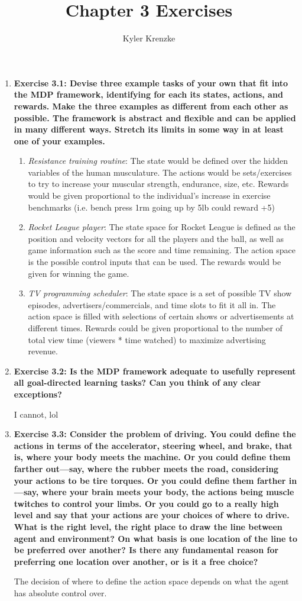 \documentclass[11pt]{article}
\title{Chapter 3 Exercises}
\author{Kyler Krenzke}
\date{}
\begin{document}
	\maketitle
	
	\begin{enumerate}
	
		\item \textbf{Exercise 3.1: Devise three example tasks of your own that fit into the MDP framework, identifying for each its states, actions, and rewards. Make the three
		examples as different from each other as possible. The framework is abstract and flexible and can be applied in many different ways. Stretch its limits in some way in at
		least one of your examples.}
		\begin{enumerate}
			\item \textit{Resistance training routine}: The state would be defined over the hidden variables of the human musculature. The actions would be sets/exercises to try
			to increase your muscular strength, endurance, size, etc. Rewards would be given proportional to the individual's increase in exercise benchmarks (i.e. bench press 1rm
			going up by 5lb could reward +5)
			\item \textit{Rocket League player}: The state space for Rocket League is defined as the position and velocity vectors for all the players and the ball, as well as
			game information such as the score and time remaining. The action space is the possible control inputs that can be used. The rewards would be given for winning the
			game.
			\item \textit{TV programming scheduler}: The state space is a set of possible TV show episodes, advertisers/commercials, and time slots to fit it all in. The action
			space is filled with selections of certain shows or advertisements at different times. Rewards could be given proportional to the number of total view time (viewers *
			time watched) to maximize advertising revenue.
		\end{enumerate}
		
		\item \textbf{Exercise 3.2: Is the MDP framework adequate to usefully represent all goal-directed learning tasks? Can you think of any clear exceptions?}
		
		I cannot, lol
		
		\item \textbf{Exercise 3.3: Consider the problem of driving. You could define the actions in terms of the accelerator, steering wheel, and brake, that is, where your body
		meets the machine. Or you could define them farther out—say, where the rubber meets the road, considering your actions to be tire torques. Or you could define them farther
		in—say, where your brain meets your body, the actions being muscle twitches to control your limbs. Or you could go to a really high level and say that your actions are
		your choices of where to drive. What is the right level, the right place to draw the line between agent and environment? On what basis is one location of the line to be
		preferred over another? Is there any fundamental reason for preferring one location over another, or is it a free choice?}
		
		The decision of where to define the action space depends on what the agent has absolute control over. 
	
	\end{enumerate}
\end{document}
